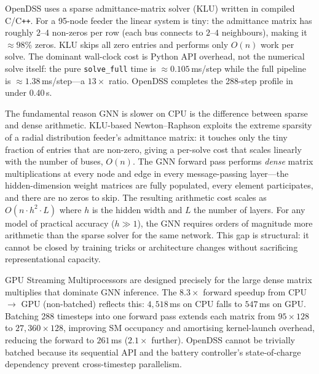 \documentclass[11pt]{article}
\begin{document}
\begin{description}[style=unboxed, leftmargin=0pt, labelwidth=0pt]

  \item[\textbf{Why OpenDSS is fast on this case.}]
  OpenDSS uses a sparse admittance-matrix solver (KLU) written in compiled
  C/C\texttt{++}.  For a 95-node feeder the linear system is tiny: the
  admittance matrix has roughly $2$--$4$ non-zeros per row (each bus connects
  to $2$--$4$ neighbours), making it ${\approx}98\%$ zeros.  KLU skips all
  zero entries and performs only $O(n)$ work per solve.  The dominant
  wall-clock cost is Python API overhead, not the numerical solve itself:
  the pure \texttt{solve\_full} time is ${\approx}0.105$\,ms/step while the
  full pipeline is ${\approx}1.38$\,ms/step---a $13\times$ ratio.  OpenDSS
  completes the 288-step profile in under 0.40\,s.

  \item[\textbf{Sparse NR vs.\ dense GNN: the FLOP-count gap.}]
  The fundamental reason GNN is slower on CPU is the difference between
  sparse and dense arithmetic.  KLU-based Newton--Raphson exploits the extreme
  sparsity of a radial distribution feeder's admittance matrix: it touches
  only the tiny fraction of entries that are non-zero, giving a per-solve cost
  that scales linearly with the number of buses, $O(n)$.  The GNN forward pass
  performs \emph{dense} matrix multiplications at every node and edge in every
  message-passing layer---the hidden-dimension weight matrices are fully
  populated, every element participates, and there are no zeros to skip.  The
  resulting arithmetic cost scales as $O(n \cdot h^{2} \cdot L)$ where $h$ is
  the hidden width and $L$ the number of layers.  For any model of practical
  accuracy ($h \gg 1$), the GNN requires orders of magnitude more arithmetic
  than the sparse solver for the same network.  This gap is structural: it
  cannot be closed by training tricks or architecture changes without
  sacrificing representational capacity.

  \item[\textbf{Why GPU and batching close the gap.}]
  GPU Streaming Multiprocessors are designed precisely for the large dense
  matrix multiplies that dominate GNN inference.  The $8.3\times$ forward
  speedup from CPU $\to$ GPU (non-batched) reflects this: $4{,}518$\,ms on
  CPU falls to $547$\,ms on GPU.  Batching 288 timesteps into one forward pass
  extends each matrix from $95 \times 128$ to $27{,}360 \times 128$, improving
  SM occupancy and amortising kernel-launch overhead, reducing the forward
  to $261$\,ms ($2.1\times$ further).  OpenDSS cannot be trivially batched
  because its sequential API and the battery controller's state-of-charge
  dependency prevent cross-timestep parallelism.


\end{description}
\end{document}
